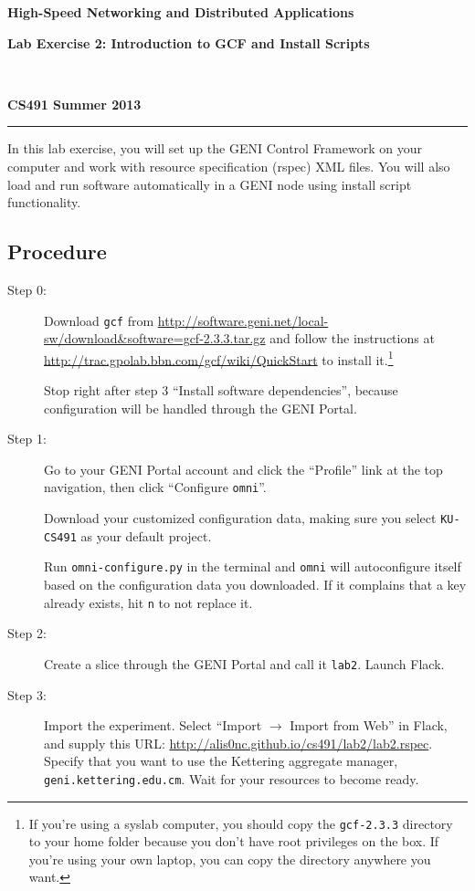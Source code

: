 \documentclass[12pt,letterpaper]{article}
\makeatletter
\newcommand*{\textoverline}[1]{$\overline{\hbox{#1}}\m@th$}
\newcommand*{\fitb}[2]
{\raisebox{-1.3ex}{\textoverline{{\makebox[#1]{{\rule{0pt}{5pt}\tiny #2}}}}}}
\makeatother
\begin{document}
\raggedright
\centerline{\textbf{High-Speed Networking and Distributed Applications}}
\centerline{\textbf{Lab Exercise 2: Introduction to GCF and Install Scripts}}
~\\
\centerline{\textbf{CS491 \hfill Summer 2013}}
\noindent\rule{\textwidth}{1pt}

\bigskip
In this lab exercise, you will set up the GENI Control Framework on your 
computer and work with resource specification (rspec) XML files. You will also 
load and run software automatically in a GENI node using install 
script functionality.


\subsection*{Procedure}

\begin{description}

\item[Step 0:]
Download \texttt{gcf} from  
\url{http://software.geni.net/local-sw/download&software=gcf-2.3.3.tar.gz} 
and follow the instructions at 
\url{http://trac.gpolab.bbn.com/gcf/wiki/QuickStart} to install it.\footnote
    {If you're using a syslab computer, you should copy the 
    \texttt{gcf-2.3.3} directory to your home folder because you don't have 
    root privileges on the box. If you're using your own laptop, you can copy 
    the directory anywhere you want.}
    
Stop right after step 3 ``Install software dependencies'', because 
configuration will be handled through the GENI Portal.

\item[Step 1:]
Go to your GENI Portal account and click the ``Profile'' link at the top 
navigation, then click ``Configure \texttt{omni}''. 

Download your customized configuration data, making sure you select 
\texttt{KU-CS491} as your default project.

Run \texttt{omni-configure.py}
in the terminal and \texttt{omni} will autoconfigure itself based on the 
configuration data you downloaded. If it complains that a key already exists, 
hit \texttt{n} to not replace it.

\item[Step 2:]
Create a slice through the GENI Portal and call it 
\texttt{\fitb{1in}{username}lab2}. Launch Flack.

\item[Step 3:]
Import the experiment. Select ``Import $\rightarrow$ Import from Web'' in
Flack, and supply this URL: 
\url{http://alis0nc.github.io/cs491/lab2/lab2.rspec}.
Specify that you want to use the Kettering aggregate manager, 
\texttt{geni.kettering.edu.cm}. Wait for your resources to become ready.


\end{description}
\end{document}
